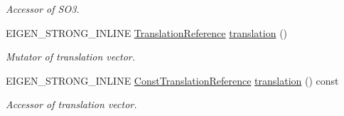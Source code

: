 \begin{DoxyCompactItemize}
\begin{DoxyCompactList}\small\item\em Accessor of S\+O3. \end{DoxyCompactList}\item 
E\+I\+G\+E\+N\+\_\+\+S\+T\+R\+O\+N\+G\+\_\+\+I\+N\+L\+I\+NE \hyperlink{class_eigen_1_1_map_3_01_sophus_1_1_s_e3_group_3_01___scalar_01_4_00_01___options_01_4_a02744f35b5be16827bff99971a171e02}{Translation\+Reference} \hyperlink{class_eigen_1_1_map_3_01_sophus_1_1_s_e3_group_3_01___scalar_01_4_00_01___options_01_4_a1479b99ef82f66adca91aa58a816d13d}{translation} ()\hypertarget{class_eigen_1_1_map_3_01_sophus_1_1_s_e3_group_3_01___scalar_01_4_00_01___options_01_4_a1479b99ef82f66adca91aa58a816d13d}{}\label{class_eigen_1_1_map_3_01_sophus_1_1_s_e3_group_3_01___scalar_01_4_00_01___options_01_4_a1479b99ef82f66adca91aa58a816d13d}

\begin{DoxyCompactList}\small\item\em Mutator of translation vector. \end{DoxyCompactList}\item 
E\+I\+G\+E\+N\+\_\+\+S\+T\+R\+O\+N\+G\+\_\+\+I\+N\+L\+I\+NE \hyperlink{class_eigen_1_1_map_3_01_sophus_1_1_s_e3_group_3_01___scalar_01_4_00_01___options_01_4_af4ec7e66b89c09a78c6290b0f3fbd747}{Const\+Translation\+Reference} \hyperlink{class_eigen_1_1_map_3_01_sophus_1_1_s_e3_group_3_01___scalar_01_4_00_01___options_01_4_adbc6745037801db5c08e6aca94219d51}{translation} () const \hypertarget{class_eigen_1_1_map_3_01_sophus_1_1_s_e3_group_3_01___scalar_01_4_00_01___options_01_4_adbc6745037801db5c08e6aca94219d51}{}\label{class_eigen_1_1_map_3_01_sophus_1_1_s_e3_group_3_01___scalar_01_4_00_01___options_01_4_adbc6745037801db5c08e6aca94219d51}

\begin{DoxyCompactList}\small\item\em Accessor of translation vector. \end{DoxyCompactList}\end{DoxyCompactItemize}
